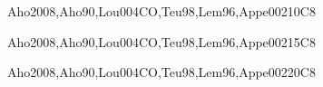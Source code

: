 \begin{syllabus}
\begin{unit}{\PLSyntaxAnalysis}{}{Aho2008,Aho90,Lou004CO,Teu98,Lem96,Appe002}{10}{C8}
\begin{topics}%
	\item \PLSyntaxAnalysisTopicScanning
	\item \PLSyntaxAnalysisTopicParsing
	\item \PLSyntaxAnalysisTopicGenerating
\end{topics}
\begin{learningoutcomes}
  
	\item \PLSyntaxAnalysisLOUseFormalSpecify [\Assessment]
	\item \PLSyntaxAnalysisLOUseDeclarative [\Assessment]
	\item \PLSyntaxAnalysisLOIdentifyKey [\Assessment]
\end{learningoutcomes}
\end{unit}

\begin{unit}{\PLCompilerSemanticAnalysis}{}{Aho2008,Aho90,Lou004CO,Teu98,Lem96,Appe002}{15}{C8}
\begin{topics}%
	\item \PLCompilerSemanticAnalysisTopicHigh
	\item \PLCompilerSemanticAnalysisTopicScope
	\item \PLCompilerSemanticAnalysisTopicType
	\item \PLCompilerSemanticAnalysisTopicDeclarative
\end{topics}
\begin{learningoutcomes}
  
	\item \PLCompilerSemanticAnalysisLOImplementContext [\Assessment]
	\item \PLCompilerSemanticAnalysisLODescribeSemantic [\Assessment]
\end{learningoutcomes}
\end{unit}

\begin{unit}{\PLCodeGeneration}{}{Aho2008,Aho90,Lou004CO,Teu98,Lem96,Appe002}{20}{C8}
\begin{topics}%
	\item \PLCodeGenerationTopicProcedure
	\item \PLCodeGenerationTopicSeparate
	\item \PLCodeGenerationTopicInstruction
	\item \PLCodeGenerationTopicInstructionScheduling
	\item \PLCodeGenerationTopicRegister
	\item \PLCodeGenerationTopicPeephole
\end{topics}
\begin{learningoutcomes}
  

\end{learningoutcomes}
\end{unit}
\end{syllabus}
